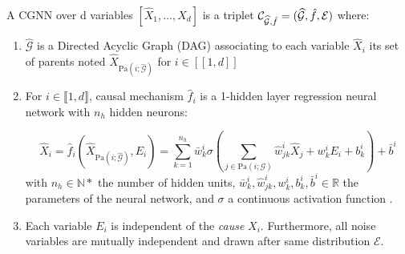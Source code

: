 \documentclass[a4paper, 11pt]{article}
\newcommand{\Pa}[1]{\text{Pa}({#1}; \mathcal{G})}
\newcommand{\Pahat}[1]{\text{Pa}({#1}; \hat{\mathcal{G}})}
\begin{document}
\begin{definition}
A CGNN over d variables $[\hat{X}_1, \ldots, \hat{X}_d]$ is a triplet $\mathcal{C}_{\widehat{\mathcal{G}},\hat{f}} = (\widehat{\mathcal{G}}, \hat{f}, {\cal E})$ where:
\begin{enumerate}
\item $\widehat{\mathcal{G}}$ is a Directed Acyclic Graph (DAG) associating to each variable $\hat{X}_i$ its set of parents noted $\hat{X}_{\Pahat{i}}$ for $i \in [[1,d]]$
\item For $i \in \llbracket 1,d \rrbracket$, causal mechanism $\hat{f}_i$ is a 1-hidden layer regression neural network with $n_h$ hidden neurons: 

\begin{equation}
\hat{X}_i  =  \hat{f}_i(\hat{X}_{\Pahat{i}}, E_i) 
 =  \sum_{k=1}^{n_h} \bar{w}^{i}_k \sigma \left(\sum_{j \in \Pa{i}} \hat{w}^{i}_{jk} \hat{X}_j 
 + w^{i}_{k} E_i +  b^{i}_k \right) +\bar{b}^{i} 
 \label{eq:fcm_neural}
\end{equation}
with $n_h \in \mathbb{N}*$  the number of hidden units, $\bar{w}^{i}_k,\hat{w}^{i}_{jk},w^{i}_{k},b^{i}_k,\bar{b}^{i} \in \mathbb{R}$ the parameters of the neural network,    and $\sigma$ a continuous activation function . 
\item Each variable $E_i$ is independent of the \textit{cause} $X_i$. Furthermore, all noise variables are mutually independent and drawn after same distribution $\mathcal{E}$. 
\end{enumerate}
\end{definition}
\end{document}
